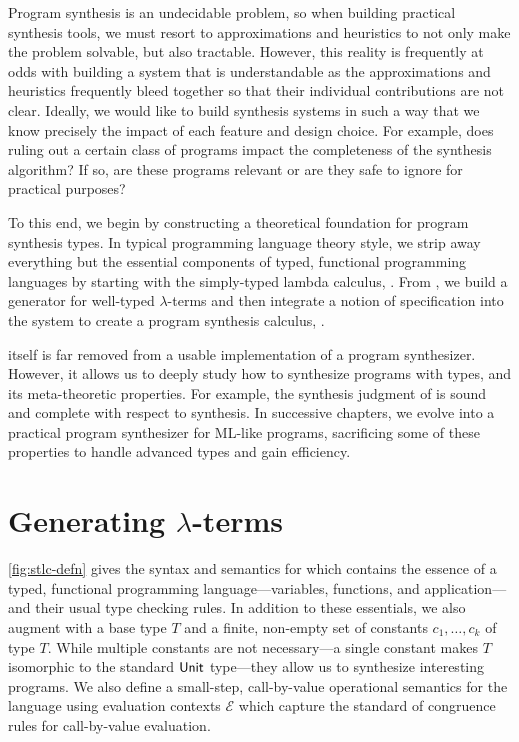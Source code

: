 Program synthesis is an undecidable problem, so when building practical synthesis tools, we must resort to approximations and heuristics to not only make the problem solvable, but also tractable.
However, this reality is frequently at odds with building a system that is understandable as the approximations and heuristics frequently bleed together so that their individual contributions are not clear.
Ideally, we would like to build synthesis systems in such a way that we know precisely the impact of each feature and design choice.
For example, does ruling out a certain class of programs impact the completeness of the synthesis algorithm?
If so, are these programs relevant or are they safe to ignore for practical purposes?

To this end, we begin by constructing a theoretical foundation for program synthesis types.
In typical programming language theory style, we strip away everything but the essential components of typed, functional programming languages by starting with the simply-typed lambda calculus, \stlc{}.
From \stlc{}, we build a generator for well-typed $λ$-terms and then integrate a notion of specification into the system to create a program synthesis calculus, \lsyn{}.

\lsyn{} itself is far removed from a usable implementation of a program synthesizer.
However, it allows us to deeply study how to synthesize programs with types, and its meta-theoretic properties.
For example, the synthesis judgment of \lsyn{} is sound and complete with respect to synthesis.
In successive chapters, we evolve \lsyn{} into a practical program synthesizer for ML-like programs, sacrificing some of these properties to handle advanced types and gain efficiency.

\section{Generating \texorpdfstring{$λ$}{λ}-terms}
\label{sec:generating-lambda-terms}



\autoref{fig:stlc-defn} gives the syntax and semantics for \stlc{} which contains the essence of a typed, functional programming language---variables, functions, and application---and their usual type checking rules.
In addition to these essentials, we also augment \stlc{} with a base type $T$ and a finite, non-empty set of constants $c_1, …, c_k$ of type $T$.
While multiple constants are not necessary---a single constant makes $T$ isomorphic to the standard $\mathsf{Unit}$ type---they allow us to synthesize interesting programs.
We also define a small-step, call-by-value operational semantics for the language using evaluation contexts $ℰ$ which capture the standard of congruence rules for call-by-value evaluation.

